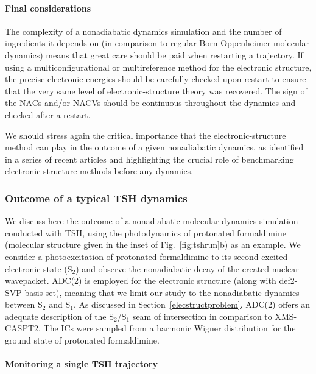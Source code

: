 \documentclass[9pt,bestpractices,pubversion]{livecoms}
\begin{document}
\paragraph{Final considerations}

The complexity of a nonadiabatic dynamics simulation and the number of ingredients it depends on (in comparison to regular Born-Oppenheimer molecular dynamics) means that great care should be paid when restarting a trajectory. If using a multiconfigurational or multireference method for the electronic structure, the precise electronic energies should be carefully checked upon restart to ensure that the very same level of electronic-structure theory was recovered. The sign of the NACs and/or NACVs should be continuous throughout the dynamics and checked after a restart.

We should stress again the critical importance that the electronic-structure method can play in the outcome of a given nonadiabatic dynamics, as identified in a series of recent articles and highlighting the crucial role of benchmarking electronic-structure methods before any dynamics.\cite{janos2023controls,papineau2024,tomas2024}

\subsubsection{Outcome of a typical TSH dynamics}
\label{sec:tshoutcome}

We discuss here the outcome of a nonadiabatic molecular dynamics simulation conducted with TSH, using the photodynamics of protonated formaldimine (molecular structure given in the inset of Fig.~\ref{fig:tshrun}b) as an example. We consider a photoexcitation of protonated formaldimine to its second excited electronic state (S$_2$) and observe the nonadiabatic decay of the created nuclear wavepacket. ADC(2) is employed for the electronic structure (along with def2-SVP basis set), meaning that we limit our study to the nonadiabatic dynamics between S$_2$ and S$_1$. As discussed in Section~\ref{elecstructproblem}, ADC(2) offers an adequate description of the S$_2$/S$_1$ seam of intersection in comparison to XMS-CASPT2. The ICs were sampled from a harmonic Wigner distribution for the ground state of protonated formaldimine. 

\paragraph{Monitoring a single TSH trajectory}
\end{document}
